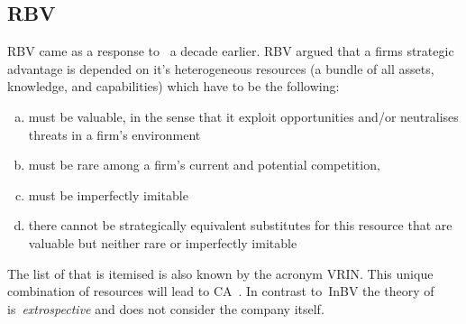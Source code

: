 \subsection{\glsdesc{RBV}} %

\Gls{RBV} came as a response to~\cite{Porter:1980} a decade earlier.
\Gls{RBV} argued that a firms strategic advantage is depended on it's heterogeneous resources (a bundle of all assets, knowledge, and capabilities) which have to be the following:

\begin{enumerate}[(a)]
   \setlength{\itemsep}{1pt}
\item must be valuable, in the sense that it exploit opportunities and/or neutralises threats in a firm’s environment
\item must be rare among a firm’s current and potential competition, 
\item must be imperfectly imitable
\item  there cannot be strategically equivalent substitutes for this resource that are valuable but neither rare or imperfectly imitable 
\end{enumerate} 
The list of that is itemised is also known by the acronym VRIN\@.
This unique combination of resources will lead to \gls{CA}~\cite{Barney:1991}. 
In contrast to~\gls{InBV} the theory of~\cite{Barney:1991} is~\emph{extrospective} and does not consider the company itself.
